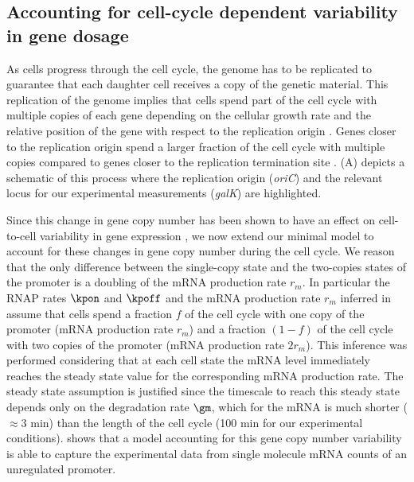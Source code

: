 \subsection{Accounting for cell-cycle dependent variability in gene dosage}
\label{sec_cell_cycle}

As cells progress through the cell cycle, the genome has to be replicated to
guarantee that each daughter cell receives a copy of the genetic material.
This replication of the genome implies that cells spend part of the cell cycle
with multiple copies of each gene depending on the cellular growth rate and the
relative position of the gene with respect to the replication origin
\cite{Bremer1996}. Genes closer to the replication origin spend a larger
fraction of the cell cycle with multiple copies compared to genes closer to the
replication termination site \cite{Bremer1996}. (A)
depicts a schematic of this process where the replication origin ({\it oriC})
and the relevant locus for our experimental measurements ({\it galK}) are
highlighted.

Since this change in gene copy number has been shown to have an effect on
cell-to-cell variability in gene expression \cite{Jones2014a, Peterson2015}, we
now extend our minimal model to account for these changes in gene copy number
during the cell cycle.  We reason that the only difference between the
single-copy state and the two-copies states of the promoter is a doubling of the
mRNA production rate $r_m$. In particular the RNAP rates $\kpon$ and $\kpoff$
and the mRNA production rate $r_m$ inferred in 
assume that cells spend a fraction $f$ of the cell cycle  with one copy of the
promoter (mRNA production rate $r_m$) and a fraction $(1-f)$ of the cell cycle
with two copies of the promoter (mRNA production rate $2 r_m$). This inference
was performed considering that at each cell state the mRNA level immediately
reaches the steady state value for the corresponding mRNA production rate. The
steady state assumption is justified since the timescale to reach this steady
state depends only on the degradation rate $\gm$, which for the mRNA  is much
shorter ($\approx 3$ min) than the length of the cell cycle (100 min for our
experimental conditions).
 shows that a model
accounting for this gene copy number variability is able to capture the
experimental data from single molecule mRNA counts of an unregulated promoter.

